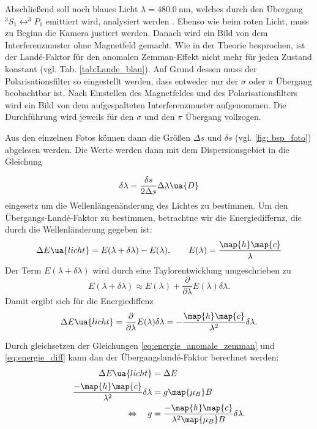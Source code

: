 Abschließend soll noch blaues Licht $\lambda=\SI{480.0}{\nm}$, welches durch den Übergang $^3S_1\leftrightarrow ^3\!\!P_1$ emittiert wird,
analysiert werden \cite{anleitung27}. Ebenso wie beim roten Licht, muss zu Beginn die Kamera justiert werden. %
Danach wird ein Bild von dem Interferenzmuster ohne Magnetfeld gemacht. Wie in der Theorie besprochen, ist der
Landé-Faktor für den anomalen Zemman-Effekt nicht mehr für jeden Zustand konstant (vgl. Tab. \ref{tab:Lande_blau}). Auf Grund dessen muss der Polarisationsfilter %
so eingestellt werden, dass entweder nur der $\sigma$ oder $\pi$ Übergang beobachtbar ist. Nach Einstellen des Magnetfeldes
und des Polarisationsfilters wird ein Bild von dem aufgespalteten Interferenzmuster aufgenommen. Die Durchführung wird jeweils %
 für den $\sigma$ und den $\pi$ Übergang vollzogen.

Aus den einzelnen Fotos können dann die Größen $\Delta s$ und $\delta s$ (vgl. \ref{fig: bsp_foto}) abgelesen werden.
Die Werte werden dann mit dem Dispersionsgebiet in die Gleichung

\begin{equation}
  \label{eq: wellen_änderung}
  \delta \lambda=\frac{\delta s}{2\Delta s} \Delta \lambda\ua{D}
\end{equation}
eingesetz um die Wellenlängenänderung des Lichtes zu bestimmen.
Um den Übergangs-Landé-Faktor zu bestimmen, betrachtne wir die Energiediffernz, die durch die Wellenländerung gegeben ist:
\begin{equation*}
  \Delta E\ua{licht}=E(\lambda+\delta\lambda)-E(\lambda),\qquad E(\lambda)=\frac{\map{h}\map{c}}{\lambda}
\end{equation*}
Der Term $E(\lambda+\delta\lambda)$ wird durch eine Taylorentwicklung umgeschrieben zu
\begin{equation*}
  E(\lambda+\delta\lambda)\approx E(\lambda)+\frac{\partial}{\partial \lambda} E(\lambda) \delta \lambda.
\end{equation*}
Damit ergibt sich für die Energiediffenz
\begin{equation}
  \label{eq:energie_diff}
  \Delta E\ua{licht}=\frac{\partial}{\partial \lambda} E(\lambda) \delta \lambda= -\frac{\map{h}\map{c}}{\lambda^2}\delta\lambda.
\end{equation}

Durch gleichsetzen der Gleichungen \eqref{eq:energie_anomale_zemman} und \eqref{eq:energie_diff} kann dan der Übergangslandé-Faktor berechnet werden:
\begin{align}
  \Delta E\ua{licht}&=\Delta E \notag \\
   \frac{-\map{h}\map{c}}{\lambda^2}\delta\lambda & =g\map{\mu_B}B \notag \\
  \Leftrightarrow \quad g&= \frac{-\map{h}\map{c}}{\lambda^2 \map{\mu_B}B}\delta\lambda \label{eq: uebergangs_lande}.
\end{align}
